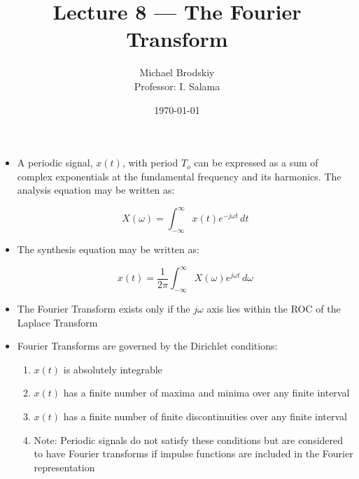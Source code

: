 


\title{Lecture 8 — The Fourier Transform}
\date{\today}
\author{Michael Brodskiy\\ \small Professor: I. Salama}



\maketitle

\begin{itemize}

  \item A periodic signal, $x(t)$, with period $T_o$ can be expressed as a sum of complex exponentials at the fundamental frequency and its harmonics. The analysis equation may be written as:

    $$X(\omega)=\int_{-\infty}^{\infty} x(t)e^{-j\omega t}\,dt$$

  \item The synthesis equation may be written as:

    $$x(t)=\frac{1}{2\pi}\int_{-\infty}^{\infty}X(\omega)e^{j\omega t}\,d\omega$$

  \item The Fourier Transform exists only if the $j\omega$ axis lies within the ROC of the Laplace Transform

  \item Fourier Transforms are governed by the Dirichlet conditions:

    \begin{enumerate}

      \item $x(t)$ is absolutely integrable

      \item $x(t)$ has a finite number of maxima and minima over any finite interval

      \item $x(t)$ has a finite number of finite discontinuities over any finite interval

      \item Note: Periodic signals do not satisfy these conditions but are considered to have Fourier transforms if impulse functions are included in the Fourier representation

    \end{enumerate}

\end{itemize}




